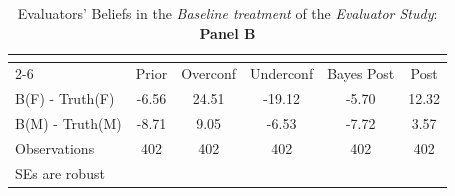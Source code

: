 \begin{table}[htbp]\centering
\caption{Evaluators' Beliefs in the \textit{Baseline treatment} of the \textit{Evaluator Study}: \textbf{Panel B}}
\begin{tabular}{l*{5}{c}}
\hline\hline
                &\multicolumn{5}{c}{}                             \\\cmidrule(lr){2-6}
                &\multicolumn{1}{c}{Prior}&\multicolumn{1}{c}{Overconf}&\multicolumn{1}{c}{Underconf}&\multicolumn{1}{c}{Bayes Post}&\multicolumn{1}{c}{Post}\\
\hline
B(F) - Truth(F) &    -6.56&    24.51&   -19.12&    -5.70&    12.32\\
B(M) - Truth(M) &    -8.71&     9.05&    -6.53&    -7.72&     3.57\\
\hline
Observations    &      402&      402&      402&      402&      402\\
\hline\hline
\multicolumn{6}{l}{\footnotesize SEs are robust}\\
\end{tabular}
\end{table}
